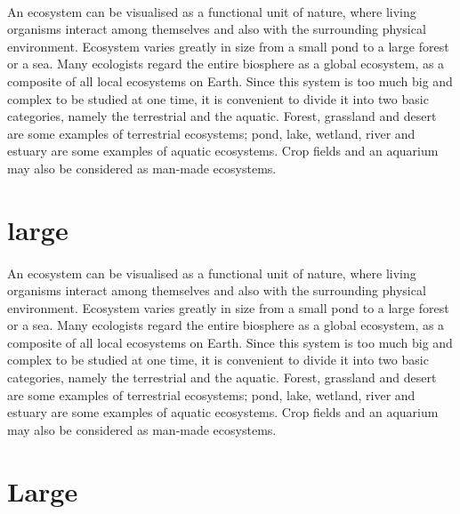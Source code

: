 \documentclass[12pt]{article}
\begin{document}
	\paragraph{}
	
	{\normalsize An ecosystem can be visualised as a functional unit of nature, where living 
		organisms interact among themselves and also with the surrounding physical 
		environment. Ecosystem varies greatly in size from a small pond to a large forest or a 
		sea. Many ecologists regard the entire biosphere as a global ecosystem, as a composite 
		of all local ecosystems on Earth. Since this system is too much big and complex to be 
		studied at one time, it is convenient to divide it into two basic categories, namely the 
		terrestrial and the aquatic. Forest, grassland and desert are some examples of terrestrial 
		ecosystems; pond, lake, wetland, river and estuary are some examples of aquatic 
		ecosystems. Crop fields and an aquarium may also be considered as man-made 
		ecosystems. }
		
	\section{large}
	\paragraph{}
	
	{\large An ecosystem can be visualised as a functional unit of nature, where living 
		organisms interact among themselves and also with the surrounding physical 
		environment. Ecosystem varies greatly in size from a small pond to a large forest or a 
		sea. Many ecologists regard the entire biosphere as a global ecosystem, as a composite 
		of all local ecosystems on Earth. Since this system is too much big and complex to be 
		studied at one time, it is convenient to divide it into two basic categories, namely the 
		terrestrial and the aquatic. Forest, grassland and desert are some examples of terrestrial 
		ecosystems; pond, lake, wetland, river and estuary are some examples of aquatic 
		ecosystems. Crop fields and an aquarium may also be considered as man-made 
		ecosystems. }
	
	\section{Large}
	\paragraph{}
	
\end{document}
